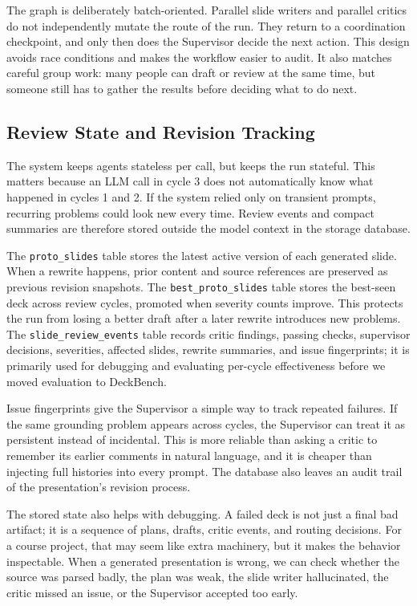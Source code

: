 \documentclass[11pt]{article}
\begin{document}
The graph is deliberately batch-oriented. Parallel slide writers and parallel critics do not independently mutate the route of the run. They return to a coordination checkpoint, and only then does the Supervisor decide the next action. This design avoids race conditions and makes the workflow easier to audit. It also matches careful group work: many people can draft or review at the same time, but someone still has to gather the results before deciding what to do next.

\subsection{Review State and Revision Tracking}

The system keeps agents stateless per call, but keeps the run stateful. This matters because an LLM call in cycle 3 does not automatically know what happened in cycles 1 and 2. If the system relied only on transient prompts, recurring problems could look new every time. Review events and compact summaries are therefore stored outside the model context in the storage database.

The \texttt{proto\_slides} table stores the latest active version of each generated slide. When a rewrite happens, prior content and source references are preserved as previous revision snapshots. The \texttt{best\_proto\_slides} table stores the best-seen deck across review cycles, promoted when severity counts improve. This protects the run from losing a better draft after a later rewrite introduces new problems. The \texttt{slide\_review\_events} table records critic findings, passing checks, supervisor decisions, severities, affected slides, rewrite summaries, and issue fingerprints; it is primarily used for debugging and evaluating per-cycle effectiveness before we moved evaluation to DeckBench.

Issue fingerprints give the Supervisor a simple way to track repeated failures. If the same grounding problem appears across cycles, the Supervisor can treat it as persistent instead of incidental. This is more reliable than asking a critic to remember its earlier comments in natural language, and it is cheaper than injecting full histories into every prompt. The database also leaves an audit trail of the presentation's revision process.

The stored state also helps with debugging. A failed deck is not just a final bad artifact; it is a sequence of plans, drafts, critic events, and routing decisions. For a course project, that may seem like extra machinery, but it makes the behavior inspectable. When a generated presentation is wrong, we can check whether the source was parsed badly, the plan was weak, the slide writer hallucinated, the critic missed an issue, or the Supervisor accepted too early.
\end{document}

